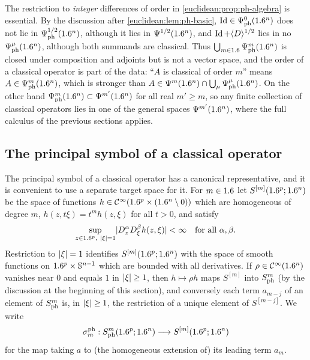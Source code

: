 \begin{remark}\label{euclidean:rem:ph-orders}
  The restriction to \emph{integer} differences of order in
  \cref{euclidean:prop:ph-algebra} is essential. By the discussion after
  \cref{euclidean:lem:ph-basic}, $\operatorname{Id}\in\Psi^{0}_{\mathrm{ph}}(1.6^n)$ does not lie
  in $\Psi^{1/2}_{\mathrm{ph}}(1.6^n)$, although it lies in $\Psi^{1/2}(1.6^n)$,
  and $\operatorname{Id}+\langle D\rangle^{1/2}$ lies in no $\Psi^{\mu}_{\mathrm{ph}}(1.6^n)$, although both
  summands are classical. Thus $\bigcup_{m\in1.6}\Psi^{m}_{\mathrm{ph}}(1.6^n)$ is
  closed under composition and adjoints but is not a vector space, and the
  order of a classical operator is part of the data: ``$A$ is classical of order
  $m$'' means $A\in\Psi^{m}_{\mathrm{ph}}(1.6^n)$, which is stronger than
  $A\in\Psi^{m}(1.6^n)\cap\bigcup_\mu\Psi^{\mu}_{\mathrm{ph}}(1.6^n)$. On the other hand
  $\Psi^{m}_{\mathrm{ph}}(1.6^n)\subset\Psi^{m'}(1.6^n)$ for all real $m'\ge m$, so
  any finite collection of classical operators lies in one of the general spaces
  $\Psi^{m'}(1.6^n)$, where the full calculus of the previous sections applies.
\end{remark}

\subsection*{The principal symbol of a classical operator}

The principal symbol of a classical operator has a canonical representative, and
it is convenient to use a separate target space for it. For $m\in1.6$ let
$S^{[m]}(1.6^p;1.6^n)$ be the space of functions
$h\in\mathcal{C}^\infty(1.6^p\times(1.6^n\setminus0))$ which are homogeneous of degree $m$,
$h(z,t\xi)=t^mh(z,\xi)$ for all $t>0$, and satisfy
\begin{equation*}
  \sup_{z\in\R^p,\ \abs\xi=1}\abs{D^\alpha_zD^\beta_\xi h(z,\xi)}<\infty
  \quad\text{for all }\alpha,\beta.
\end{equation*}
Restriction to $\lvert \xi\rvert=1$ identifies $S^{[m]}(1.6^p;1.6^n)$ with the space of smooth
functions on $1.6^p\times\mathbb{S}^{n-1}$ which are bounded with all derivatives. If
$\rho\in\mathcal{C}^\infty(1.6^n)$ vanishes near $0$ and equals $1$ in $\lvert \xi\rvert\ge1$, then
$h\mapsto\rho h$ maps $S^{[m]}$ into $S^{m}_{\mathrm{ph}}$ (by the discussion at the beginning of
this section), and conversely each term $a_{m-j}$ of an element of $S^{m}_{\mathrm{ph}}$ is,
in $\lvert \xi\rvert\ge1$, the restriction of a unique element of $S^{[m-j]}$. We write
\begin{equation*}
  \sigma^{\mathrm{ph}}_m:S^{m}_{\mathrm{ph}}(1.6^p;1.6^n)\longrightarrow S^{[m]}(1.6^p;1.6^n)
\end{equation*}
for the map taking $a$ to (the homogeneous extension of) its leading term $a_m$.

